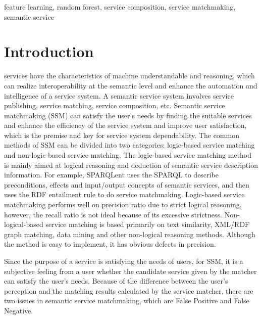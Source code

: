 \documentclass{ieeeaccess}
\begin{document}
\begin{keywords}
feature learning, random forest, service composition, service matchmaking, semantic service
\end{keywords}

\titlepgskip=-15pt

\maketitle

\section{Introduction}
\label{sec:introduction}
 services have the characteristics of machine understandable and reasoning, which can realize interoperability at the semantic level and enhance the automation and intelligence of a service system. A semantic service system involves service publishing, service matching, service composition, etc. Semantic service matchmaking (SSM) can satisfy the user's needs by finding the suitable services and enhance the efficiency of the service system and improve user satisfaction, which is the premise and key for service system dependability. The common methods of SSM can be divided into two categories: logic-based service matching and non-logic-based service matching. The logic-based service matching method is mainly aimed at logical reasoning and deduction of semantic service description information. For example, SPARQLent \cite{sbodio2010discovering} uses the SPARQL to describe preconditions, effects and input/output concepts of semantic services, and then uses the RDF entailment rule to do service matchmaking. Logic-based service matchmaking performs well on precision ratio due to strict logical reasoning, however, the recall ratio is not ideal because of its excessive strictness. Non-logical-based service matching is based primarily on text similarity, XML/RDF graph matching, data mining and other non-logical reasoning methods. Although the method is easy to implement, it has obvious defects in precision.

Since the purpose of a service is satisfying the needs of users, for SSM, it is a subjective feeling from a user whether the candidate service given by the matcher can satisfy the user's needs. Because of the difference between the user's perception and the matching results calculated by the service matcher, there are two issues in semantic service matchmaking, which are False Positive and False Negative.
\end{document}
